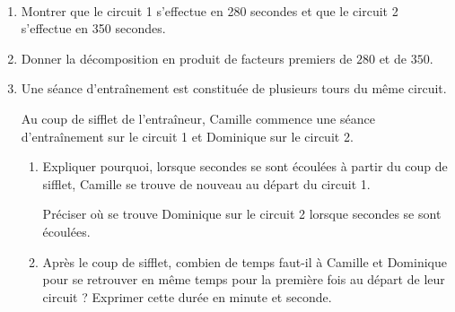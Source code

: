 \documentclass[11pt]{article}
\begin{document}
\begin{center}
\hfill~

\end{center}

\begin{enumerate}
\item Montrer que le circuit 1 s'effectue en 280 secondes et que le circuit 2 s'effectue en 350 secondes.
\item Donner la décomposition en produit de facteurs premiers de $280$ et de $350$.
\item Une séance d'entraînement est constituée de plusieurs tours du même circuit.

Au coup de sifflet de l'entraîneur, Camille commence une séance d'entraînement sur le circuit 1 et Dominique sur le circuit 2.

	\begin{enumerate}
		\item Expliquer pourquoi, lorsque  secondes se sont écoulées à partir du coup de sifflet, Camille se trouve de nouveau au départ du circuit 1.

		Préciser où se trouve Dominique sur le circuit 2 lorsque  secondes se sont écoulées.

		\item Après le coup de sifflet, combien de temps faut-il à Camille et Dominique pour se retrouver en même temps pour la première fois au départ de leur circuit ? Exprimer cette durée en minute et seconde.
	\end{enumerate}
\end{enumerate}

\newpage
\end{document}
